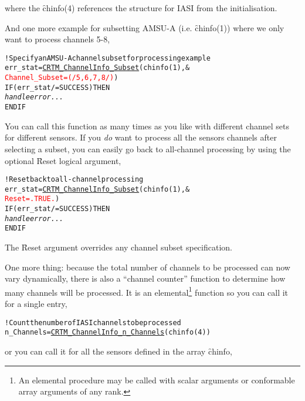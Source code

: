 where the \f{chinfo(4)} references the \hyperref[fig:CRTM_ChannelInfo_type_structure]{\ChannelInfo} structure for IASI from the initialisation.

And one more example for subsetting AMSU-A (i.e. \f{chinfo(1)}) where we only want to process channels 5-8,

\begin{alltt}
  ! Specify an AMSU-A channel subset for processing example
  err_stat = \hyperref[sec:CRTM_ChannelInfo_Subset_interface]{CRTM_ChannelInfo_Subset}( chinfo(1), &
                                      \textcolor{red}{Channel_Subset = (/5,6,7,8/)} )
  IF ( err_stat /= SUCCESS ) THEN
    \textrm{\textit{handle error...}}
  END IF\end{alltt}

You can call this function as many times as you like with different channel sets for different sensors. If you \emph{do} want to process all the sensors channels after selecting a subset, you can easily go back to all-channel processing by using the optional \f{Reset} logical argument,

\begin{alltt}
  ! Reset back to all-channel processing
  err_stat = \hyperref[sec:CRTM_ChannelInfo_Subset_interface]{CRTM_ChannelInfo_Subset}( chinfo(1), &
                                      \textcolor{red}{Reset = .TRUE.} )
  IF ( err_stat /= SUCCESS ) THEN
    \textrm{\textit{handle error...}}
  END IF\end{alltt}

The \f{Reset} argument overrides any channel subset specification.

One more thing: because the total number of channels to be processed can now vary dynamically, there is also a ``channel counter'' function to determine how many channels will be processed. It is an elemental\footnote{An elemental procedure may be called with scalar arguments or conformable array arguments of any rank.} function so you can call it for a single \hyperref[fig:CRTM_ChannelInfo_type_structure]{\ChannelInfo} entry,

\begin{alltt}
  ! Count the number of IASI channels to be processed
  n_Channels = \hyperref[sec:CRTM_ChannelInfo_n_Channels_interface]{CRTM_ChannelInfo_n_Channels}( chinfo(4) )\end{alltt}

or you can call it for all the sensors defined in the \hyperref[fig:CRTM_ChannelInfo_type_structure]{\ChannelInfo} array \f{chinfo},

